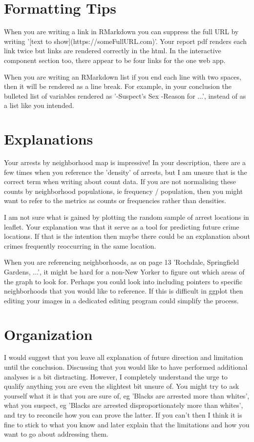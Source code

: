 \documentclass{article}
\begin{document}
\section{Formatting Tips}
When you are writing a link in RMarkdown you can suppress the full URL by writing '[text to show](https://someFullURL.com)'. Your report pdf renders each link twice but links are rendered correctly in the html. In the interactive component section too, there appear to be four links for the one web app.

When you are writing an RMarkdown list if you end each line with two spaces, then it will be rendered as a line break. For example, in your conclusion the bulleted list of variables rendered as '-Suspect's Sex -Reason for ...', instead of as a list like you intended.

\section{Explanations}
Your arrests by neighborhood map is impressive! In your description, there are a few times when you reference the 'density' of arrests, but I am unsure that is the correct term when writing about count data. If you are not normalising these counts by neighborhood populations, ie frequency / population, then you might want to refer to the metrics as counts or frequencies rather than densities.

I am not sure what is gained by plotting the random sample of arrest locations in leaflet. Your explanation was that it serve as a tool for predicting future crime locations. If that is the intention then maybe there could be an explanation about crimes frequently reoccurring in the same location.

When you are referencing neighborhoods, as on page 13 'Rochdale, Springfield Gardens, ...', it might be hard for a non-New Yorker to figure out which areas of the graph to look for. Perhaps you could look into including pointers to specific neighborhoods that you would like to reference. If this is difficult in ggplot then editing your images in a dedicated editing program could simplify the process.

\section{Organization}
I would suggest that you leave all explanation of future direction and limitation until the conclusion. Discussing that you would like to have performed additional analyses is a bit distracting. However, I completely understand the urge to qualify anything you are even the slightest bit unsure of. You might try to ask yourself what it is that you are sure of, eg 'Blacks are arrested more than whites', what you suspect, eg 'Blacks are arrested disproportionately more than whites', and try to reconcile how you can prove the latter. If you can't then I think it is fine to stick to what you know and later explain that the limitations and how you want to go about addressing them.
\end{document}
